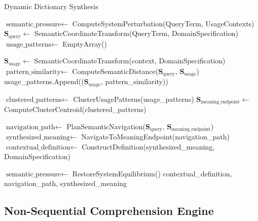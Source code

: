 \documentclass[12pt,a4paper]{article}
\begin{document}
\begin{algorithm}[H]
\caption{Dynamic Dictionary Synthesis}
\label{alg:dynamic_dictionary}
\begin{algorithmic}[1]
    \State $\text{semantic\_pressure} \gets$ ComputeSystemPerturbation(QueryTerm, UsageContexts)
    \State $\mathbf{S}_{\text{query}} \gets$ SemanticCoordinateTransform(QueryTerm, DomainSpecification)
    \State $\text{usage\_patterns} \gets$ EmptyArray()
    
        \State $\mathbf{S}_{\text{usage}} \gets$ SemanticCoordinateTransform(context, DomainSpecification)
        \State $\text{pattern\_similarity} \gets$ ComputeSemanticDistance($\mathbf{S}_{\text{query}}$, $\mathbf{S}_{\text{usage}}$)
        \State usage\_patterns.Append(($\mathbf{S}_{\text{usage}}$, pattern\_similarity))
    \EndFor
    
    \State $\text{clustered\_patterns} \gets$ ClusterUsagePatterns(usage\_patterns)
    \State $\mathbf{S}_{\text{meaning\_endpoint}} \gets$ ComputeClusterCentroid(clustered\_patterns)
    
    \State $\text{navigation\_path} \gets$ PlanSemanticNavigation($\mathbf{S}_{\text{query}}$, $\mathbf{S}_{\text{meaning\_endpoint}}$)
    \State $\text{synthesized\_meaning} \gets$ NavigateToMeaningEndpoint(navigation\_path)
    \State $\text{contextual\_definition} \gets$ ConstructDefinition(synthesized\_meaning, DomainSpecification)
    
    \State $\text{semantic\_pressure} \gets$ RestoreSystemEquilibrium()
    \State \Return contextual\_definition, navigation\_path, synthesized\_meaning
\EndProcedure
\end{algorithmic}
\end{algorithm}

\subsection{Non-Sequential Comprehension Engine}
\end{document}
